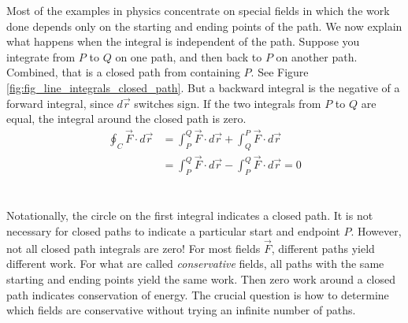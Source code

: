 Most of the examples in physics concentrate on special fields in which the work done depends only on the starting and ending points of the path. We now explain what happens when the integral is independent of the path. Suppose you integrate from $P$ to $Q$ on one path, and then back to $P$ on another path. Combined, that is a closed path from containing $P$. See Figure \ref{fig:fig_line_integrals_closed_path}. But a backward integral is the negative of a forward integral, since $d\vec r$ switches sign. If the two integrals from $P$ to $Q$ are equal, the integral around the closed path is zero.
\begin{align*}
\oint_C \vec F \cdot d\vec r & = \int_P^Q \vec F \cdot d\vec r + \int_Q^P \vec F \cdot d\vec r \\
 & = \int_P^Q\vec F \cdot d\vec r - \int_P^Q\vec F \cdot d\vec r = 0 \\
\end{align*}\\


Notationally, the circle on the first integral indicates a closed path. It is not necessary for closed paths to indicate a particular start and endpoint $P$. However, not all closed path integrals are zero! For most fields $\vec F$, different paths yield
different work. For what are called \emph{conservative} fields, all paths with the same starting and ending points yield the same work. Then zero work around a closed path indicates conservation of energy. The crucial question is how to determine which fields are conservative without trying an infinite number of paths.\\

\\

